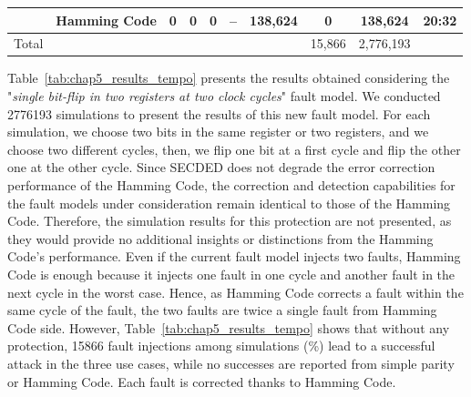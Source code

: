 \begin{table}[t]
\begin{tabular}{@{}cccccccccc@{}}
                                                          & Hamming Code  & 0     & 0       & 0      & --         & 138,624                                  & 0               & 138,624   & 20:32                           \\\midrule
        Total                                             &               &       &         &        &           &                                          & 15,866          & 2,776,193 &                                 \\
        \bottomrule
    \end{tabular}
\end{table}

Table~\ref{tab:chap5_results_tempo} presents the results obtained considering the "\textit{single bit-flip in two registers at two clock cycles}" fault model. We conducted \num{2776193} simulations to present the results of this new fault model. For each simulation, we choose two bits in the same register or two registers, and we choose two different cycles, then, we flip one bit at a first cycle and flip the other one at the other cycle. Since SECDED does not degrade the error correction performance of the Hamming Code, the correction and detection capabilities for the fault models under consideration remain identical to those of the Hamming Code. Therefore, the simulation results for this protection are not presented, as they would provide no additional insights or distinctions from the Hamming Code's performance.
Even if the current fault model injects two faults, Hamming Code is enough because it injects one fault in one cycle and another fault in the next cycle in the worst case. Hence, as Hamming Code corrects a fault within the same cycle of the fault, the two faults are twice a single fault from Hamming Code side.
However, Table~\ref{tab:chap5_results_tempo} shows that without any protection, \num{15866} fault injections among  simulations (\%) lead to a successful attack in the three use cases, while no successes are reported from simple parity or Hamming Code. Each fault is corrected thanks to Hamming Code.


